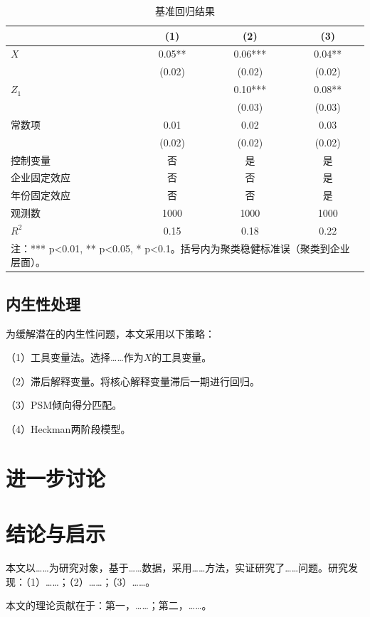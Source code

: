 \documentclass[10pt, UTF8, twocolumn]{ctexart}
\newcommand{\xiaosi}{\fontsize{12pt}{18pt}\selectfont}
\begin{document}
\begin{table}[htbp]
\centering
\caption{基准回归结果}
\label{tab:reg}
\xiaosi
\begin{tabular}{lccc}
\toprule
 & (1) & (2) & (3) \\
\midrule
$X$ & 0.05** & 0.06*** & 0.04** \\
    & (0.02) & (0.02) & (0.02) \\
$Z_1$ & & 0.10*** & 0.08** \\
      &      & (0.03)  & (0.03) \\
\midrule
常数项 & 0.01 & 0.02 & 0.03 \\
       & (0.02) & (0.02) & (0.02) \\
\midrule
控制变量 & 否 & 是 & 是 \\
企业固定效应 & 否 & 否 & 是 \\
年份固定效应 & 否 & 否 & 是 \\
\midrule
观测数 & 1000 & 1000 & 1000 \\
$R^2$ & 0.15 & 0.18 & 0.22 \\
\bottomrule
\multicolumn{4}{l}{\small 注：*** p<0.01, ** p<0.05, * p<0.1。括号内为聚类稳健标准误（聚类到企业层面）。}
\end{tabular}
\end{table}

\subsection{内生性处理}
为缓解潜在的内生性问题，本文采用以下策略：

（1）工具变量法。选择……作为$X$的工具变量。

（2）滞后解释变量。将核心解释变量滞后一期进行回归。

（3）PSM倾向得分匹配。

（4）Heckman两阶段模型。

\section{进一步讨论}
\label{sec:further}

\section{结论与启示}
\label{sec:concl}

本文以……为研究对象，基于……数据，采用……方法，实证研究了……问题。研究发现：（1）……；（2）……；（3）……。

本文的理论贡献在于：第一，……；第二，……。
\end{document}
